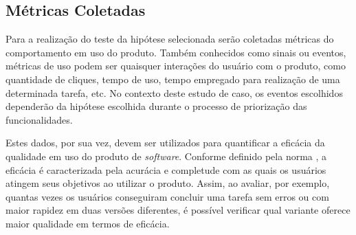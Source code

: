 \subsection{Métricas Coletadas}

Para a realização do teste da hipótese selecionada serão coletadas métricas do comportamento em uso do produto. Também conhecidos como sinais ou eventos, métricas de uso podem ser quaisquer interações do usuário com o produto, como quantidade de cliques, tempo de uso, tempo empregado para realização de uma determinada tarefa, etc. No contexto deste estudo de caso, os eventos escolhidos dependerão da hipótese escolhida durante o processo de priorização das funcionalidades.

Estes dados, por sua vez, devem ser utilizados para quantificar a eficácia da qualidade em uso do produto de \textit{software}. Conforme definido pela norma , a eficácia é caracterizada pela acurácia e completude com as quais os usuários atingem seus objetivos ao utilizar o produto. Assim, ao avaliar, por exemplo, quantas vezes os usuários conseguiram concluir uma tarefa sem erros ou com maior rapidez em duas versões diferentes, é possível verificar qual variante oferece maior qualidade em termos de eficácia.
